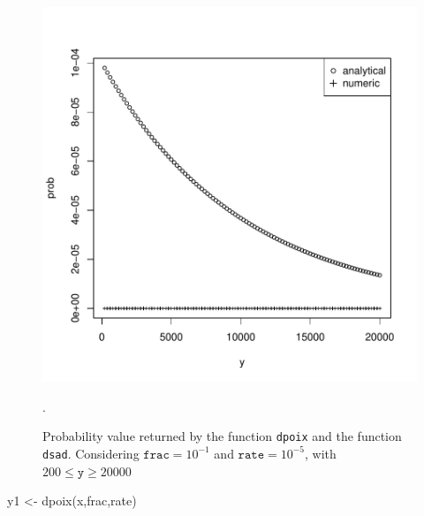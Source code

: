 \documentclass{article}
\newcommand{\code}[1]{\texttt{#1}}
\begin{document}
\begin{figure}[ht]
  \begin{center}
\includegraphics{sads_logbook-007}
\end{center}
\caption{Probability value returned by the function \code{dpoix} and the function \code{dsad}. Considering $\code{frac}=10^{-1}$ and $\code{rate}=10^{-5}$, with $200 \leq \code{y} \geq 20000$}.
\label{fig:abs.tol}
\end{figure}

y1 <- dpoix(x,frac,rate)
\end{document}
